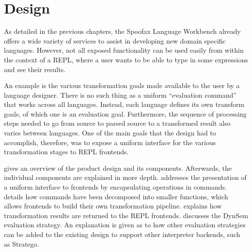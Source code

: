 \chapter{Design}
\label{cha:design}

As detailed in the previous chapters, the Spoofax Language Workbench already
offers a wide variety of services to assist in developing new domain specific
languages. However, not all exposed functionality can be used easily from within
the context of a REPL, where a user wants to be able to type in some expressions
and see their results.

An example is the various transformation goals made available to the user by a
language designer. There is no such thing as a uniform ``evaluation command''
that works across all languages. Instead, each language defines its own
transform goals, of which one is an evaluation goal. Furthermore, the sequence
of processing steps needed to go from source to parsed source to a transformed
result also varies between languages. One of the main goals that the design had to
accomplish, therefore, was to expose a uniform interface for the various
transformation stages to REPL frontends.

 gives an overview of the product design and its components.
Afterwards, the individual components are explained in more depth.
 addresses the presentation of a uniform interface to
frontends by encapsulating operations in commands. 
details how commands have been decomposed into smaller functions, which allows
frontends to build their own transformation pipeline. 
explains how transformation results are returned to the REPL frontends.
 discusses the DynSem evaluation strategy. An explanation
is given as to how other evaluation strategies can be added to the existing
design to support other interpreter backends, such as Stratego.











